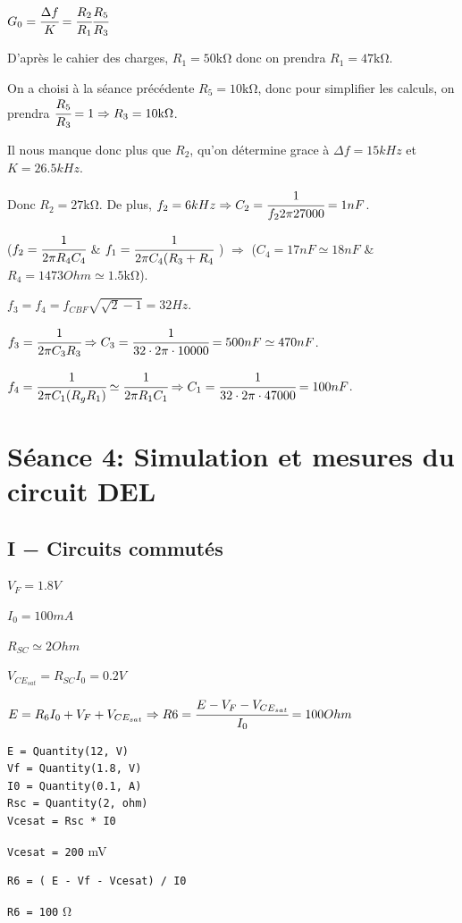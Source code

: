 
$G_0 = \cfrac{\Delta f}{K} = \cfrac{R_2}{R_1}\cfrac{R_5}{R_3}$

D’après le cahier des charges, $R_1 = 50 \si{\kilo\ohm}$ donc on prendra $R_1 = 47 \si{\kilo\ohm}$.

On a choisi à la séance précédente $R_5 = 10 \si{\kilo\ohm}$, donc pour simplifier les calculs, on prendra $\cfrac{R_5}{R_3} = 1 \Rightarrow R_3 = 10 \si{\kilo\ohm}$.

Il nous manque donc plus que $R_2$, qu’on détermine grace à $\Delta f = 15 kHz$ et $K = 26.5 kHz$.

Donc $R_2 = 27 \si{\kilo\ohm}$. De plus, $f_2 = 6 kHz \Rightarrow C_2 = \cfrac{1}{f_2 2 \pi 27000} = 1 nF$.

($f_2 = \cfrac{1}{2\pi R_4 C_4}$ \& $f_1 = \cfrac{1}{2\pi C_4(R_3 + R_4}$ ) $\Rightarrow$ ($C_4 = 17 nF \simeq 18nF$ \& $R_4 = 1473 Ohm \simeq 1.5 \si{\kilo\ohm}$).

$f_3 = f_4 = f_{CBF}\sqrt{\sqrt{2}-1} = 32 Hz$.

$f_3 = \cfrac{1}{2\pi C_3R_3} \Rightarrow C_3 = \cfrac{1}{32 \cdot 2 \pi \cdot 10000} = 500nF \simeq 470 nF$.

$f_4 = \cfrac{1}{2\pi C_1 (R_gR_1)} \simeq \cfrac{1}{2\pi R_1C_1} \Rightarrow C_1 = \cfrac{1}{32 \cdot 2 \pi \cdot 47000} = 100nF$.
\section{Séance 4: Simulation et mesures du circuit DEL}
\subsection{I − Circuits commutés}

$V_F=1.8V$

$I_0=100mA$

$R_{SC}\simeq 2Ohm$

$V_{CE_{sat}}=R_{SC}I_0=0.2V$

$E=R_6I_0+V_F+V_{CE_{sat}}\Rightarrow R6=\cfrac{E-V_F-V_{CE_{sat}}}{I_0}=100Ohm$
\begin{verbatim}
E = Quantity(12, V)
Vf = Quantity(1.8, V)
I0 = Quantity(0.1, A)
Rsc = Quantity(2, ohm)
Vcesat = Rsc * I0
\end{verbatim}
\verb|Vcesat = 200| \si{\milli\volt}
\begin{verbatim}
R6 = ( E - Vf - Vcesat) / I0
\end{verbatim}
\verb|R6 = 100| \si\ohm

